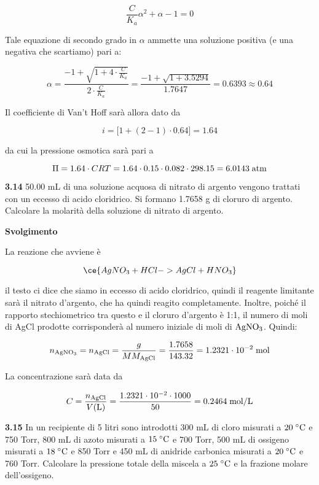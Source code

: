 $$\frac{C}{K_a}\alpha^2 + \alpha -1=0$$

Tale equazione di secondo grado in $\alpha$ ammette una soluzione positiva (e una negativa che scartiamo) pari a:

$$\alpha=\frac{-1 + \sqrt{1 + 4 \cdot \displaystyle \frac{C}{K_a}}}{2 \cdot \displaystyle \frac{C}{K_a}}
=\frac{-1 + \sqrt{1 + 3.5294}}{1.7647}=0.6393\approx0.64$$

Il coefficiente di Van't Hoff sarà allora dato da

$$i=\big[1 + (2-1) \cdot 0.64\big]=1.64$$

da cui la pressione osmotica sarà pari a

$$\Pi=1.64 \cdot CRT
=1.64 \cdot 0.15 \cdot 0.082 \cdot 298.15
=6.0143 \; \rm atm$$

\vspace{0.2cm}\textbf{3.14} 50.00 mL di una soluzione acquosa di nitrato di argento vengono trattati con un eccesso di acido
cloridrico. Si formano 1.7658 g di cloruro di argento. Calcolare la molarità della soluzione di nitrato
di argento.

\vspace{0.2cm}\large\textbf{Svolgimento}\normalsize

\vspace{0.2cm}La reazione che avviene è

$$\ce{AgNO_3 + HCl -> AgCl + HNO_3}$$

il testo ci dice che siamo in eccesso di acido cloridrico, quindi il reagente limitante sarà il nitrato d'argento, che ha quindi reagito completamente. Inoltre, poiché il rapporto stechiometrico tra questo e il cloruro d'argento è 1:1, il numero di moli di AgCl prodotte corrisponderà al numero iniziale di moli di $\rm AgNO_3$. Quindi:

$$n_{\rm AgNO_3}=n_{\rm AgCl}=\frac{g}{MM_{\rm AgCl}}
=\frac{1.7658}{143.32}=1.2321 \cdot 10^{-2} \; \rm mol$$

La concentrazione sarà data da

$$C=\frac{n_{\rm AgCl}}{V(\text{L})}
=\frac{1.2321 \cdot 10^{-2} \cdot 1000}{50}
=0.2464 \; \rm mol/L$$

\vspace{0.2cm}\textbf{3.15} In un recipiente di 5 litri sono introdotti 300 mL di cloro misurati a $20 \; ^{\circ} \rm C$ e 750 Torr, 800 mL di azoto misurati a $15 \; ^{\circ} \rm C$ e 700 Torr, 500 mL di ossigeno misurati a $18 \; ^{\circ} \rm C$ e 850 Torr e 450 mL di anidride carbonica misurati a $20 \; ^{\circ} \rm C$ e 760 Torr. Calcolare la pressione totale della miscela a $25 \; ^{\circ} \rm C$ e la frazione molare dell'ossigeno.

